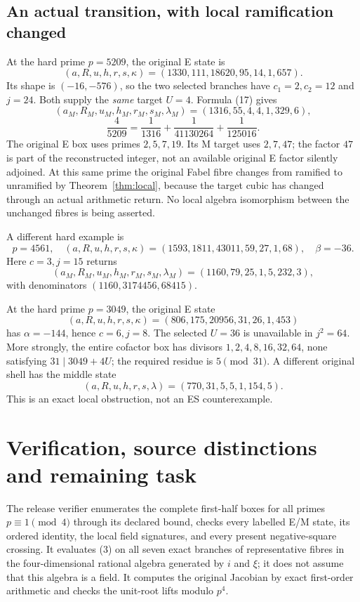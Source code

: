 \subsection{An actual transition, with local ramification changed}
At the hard prime $p=5209$, the original E state is
\[
 (a,R,u,h,r,s,\kappa)=(1330,111,18620,95,14,1,657).
\]
Its shape is $(-16,-576)$, so the two selected branches have $c_1=2,c_2=12$
and $j=24$. Both supply the \emph{same} target $U=4$. Formula (17) gives
\[
 (a_M,R_M,u_M,h_M,r_M,s_M,\lambda_M)=(1316,55,4,4,1,329,6),
\]
\[
 \boxed{\frac4{5209}=\frac1{1316}+\frac1{41130264}+\frac1{125016}.}   \tag{18}
\]
The original E box uses primes $2,5,7,19$. Its M target uses $2,7,47$; the
factor $47$ is part of the reconstructed integer, not an available original
E factor silently adjoined. At this same prime the original Fabel fibre changes
from ramified to unramified by Theorem~\ref{thm:local}, because the target cubic
has changed through an actual arithmetic return. No local algebra isomorphism
between the unchanged fibres is being asserted.

A different hard example is
\[
 p=4561,\quad(a,R,u,h,r,s,\kappa)=(1593,1811,43011,59,27,1,68),
 \quad\beta=-36.
\]
Here $c=3,j=15$ returns
\[
 (a_M,R_M,u_M,h_M,r_M,s_M,\lambda_M)=(1160,79,25,1,5,232,3),
\]
with denominators $(1160,3174456,68415)$.

At the hard prime \(p=3049\), the original E state
\[
 (a,R,u,h,r,s,\kappa)=(806,175,20956,31,26,1,453)
\]
has \(\alpha=-144\), hence \(c=6,j=8\).  The selected \(U=36\) is unavailable
in \(j^2=64\).
More strongly, the entire cofactor box has divisors
\(1,2,4,8,16,32,64\), none satisfying \(31\mid3049+4U\); the required residue
is \(5\pmod{31}\). A different original shell has the middle state
\[
 (a,R,u,h,r,s,\lambda)=(770,31,5,5,1,154,5).
\]
This is an exact local obstruction, not an ES counterexample.

\section{Verification, source distinctions and remaining task}
The release verifier enumerates the complete first-half boxes for all primes
$p\equiv1\pmod4$ through its declared bound, checks every labelled E/M state,
its ordered identity, the local field signatures, and every present negative-square
crossing. It evaluates (3) on all seven exact branches of representative fibres
in the four-dimensional rational algebra generated by $i$ and $\xi$; it does not
assume that this algebra is a field. It computes the original Jacobian by exact
first-order arithmetic and checks the unit-root lifts modulo $p^4$.

